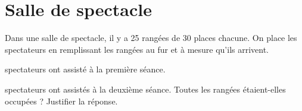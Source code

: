 \section{Salle de spectacle}

Dans une salle de spectacle, il y a 25 rangées de 30 places chacune. On place les spectateurs en remplissant les rangées au fur et à mesure qu'ils arrivent.

\begin{questions}
	 spectateurs ont assisté à la première séance.
	

	 spectateurs ont assistés à la deuxième séance.
	Toutes les rangées étaient-elles occupées ? Justifier la réponse.
\end{questions}